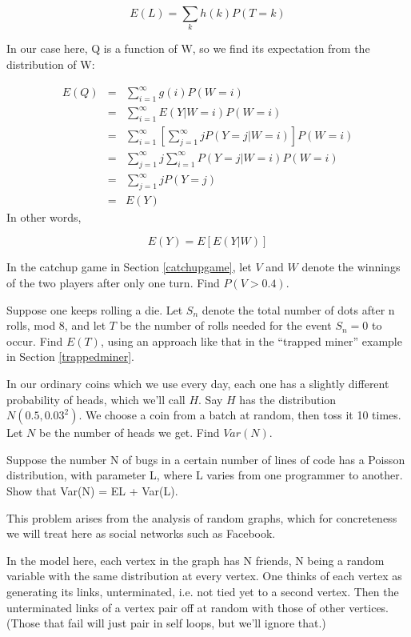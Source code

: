 \begin{equation}
\label{unconscious}
E(L) = \sum_k h(k) P(T = k)
\end{equation}

In our case here, Q is a function of W, so we find its expectation from
the distribution of W:

\begin{eqnarray*}
E(Q) & = & \sum ^{\infty }_{i=1}g(i) P(W=i)\\
 & = & \sum ^{\infty }_{i=1}E(Y|W=i)P(W=i)\\
 & = & \sum ^{\infty }_{i=1} \left [ \sum ^{\infty }_{j=1}jP(Y=j|W=i) \right ] P(W=i) \\
 & = & \sum ^{\infty }_{j=1}j\sum ^{\infty }_{i=1}P(Y=j|W=i)P(W=i)\\
 & = & \sum ^{\infty }_{j=1}jP(Y=j)\\
 & = & E(Y)
\end{eqnarray*}
 In other words, 

\begin{equation}
E(Y)=E[E(Y|W)]
\end{equation}

\startproblemset

\oneproblem
In the catchup game in Section \ref{catchupgame}, let $V$ and $W$ denote
the winnings of the two players after only one turn.  Find $P(V > 0.4)$.

\oneproblem 
Suppose one keeps rolling a die. Let $S_n$ denote the total
number of dots after n rolls, mod 8, and let $T$ be the number of rolls
needed for the event $S_n = 0$ to occur. Find $E(T)$, using an approach
like that in the ``trapped miner'' example in Section
\ref{trappedminer}.

\oneproblem
In our ordinary coins which we use every day, each one has a slightly 
different probability of heads, which we'll call $H$.  Say $H$ has 
the distribution $N(0.5, 0.03^2)$.  We choose a coin from a batch at 
random, then toss it 10 times.  Let $N$ be the number of heads we get.  
Find $Var(N)$.

\oneproblem
Suppose the number N of bugs in a certain number of lines of code has a
Poisson distribution, with parameter L, where L varies from one
programmer to another. Show that Var(N) = EL + Var(L).

\oneproblem
This problem arises from the analysis of random graphs, which for
concreteness we will treat here as social networks such as Facebook.

In the model here, each vertex in the graph has N friends, N being a
random variable with the same distribution at every vertex. One thinks
of each vertex as generating its links, unterminated, i.e. not tied yet
to a second vertex. Then the unterminated links of a vertex pair off at
random with those of other vertices. (Those that fail will just pair in
self loops, but we'll ignore that.)

